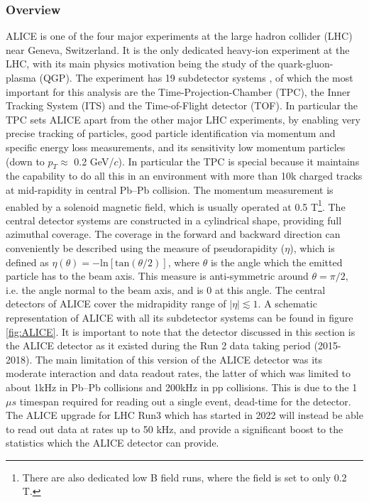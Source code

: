 \subsubsection{Overview}
ALICE is one of the four major experiments at the large hadron collider (LHC) near Geneva, Switzerland. It is the only dedicated heavy-ion experiment at the LHC, with its main physics motivation being the study of the quark-gluon-plasma (QGP). The experiment has 19 subdetector systems \cite{ALICE_overview}, of which the most important for this analysis are the Time-Projection-Chamber (TPC), the Inner Tracking System (ITS) and the Time-of-Flight detector (TOF). In particular the TPC sets ALICE apart from the other major LHC experiments, by enabling very precise tracking of particles, good particle identification via momentum and specific energy loss measurements, and its sensitivity low momentum particles (down to $p_T \approx $ 0.2 GeV/$c$). In particular the TPC is special because it maintains the capability to do all this in an environment with more than 10k charged tracks at mid-rapidity in central Pb--Pb collision. The momentum measurement is enabled by a solenoid magnetic field, which is usually operated at 0.5 T\footnote{There are also dedicated low B field runs, where the field is set to only 0.2 T.}. The central detector systems are constructed in a cylindrical shape, providing full azimuthal coverage. The coverage in the forward and backward direction can conveniently be described using the measure of pseudorapidity ($\eta$), which is defined as $\eta (\theta) = -\mathrm{ln}[\mathrm{tan}(\theta/2)]$, where $\theta$ is the angle which the emitted particle has to the beam axis. This measure is anti-symmetric around $\theta = \pi/2$, i.e. the angle normal to the beam axis, and is 0 at this angle. The central detectors of ALICE cover the midrapidity range of $|\eta|\lesssim 1$. A schematic representation of ALICE with all its subdetector systems can be found in figure \ref{fig:ALICE}. It is important to note that the detector discussed in this section is the ALICE detector as it existed during the Run 2 data taking period (2015-2018). The main limitation of this version of the ALICE detector was its moderate interaction and data readout rates, the latter of which was limited to about 1kHz in Pb--Pb collisions and 200kHz in pp collisions. This is due to the 1$\mu s$ timespan required for reading out a single event, dead-time for the detector. The ALICE upgrade for LHC Run3 which has started in 2022 will instead be able to read out data at rates up to 50 kHz, and provide a significant boost to the statistics which the ALICE detector can provide.

